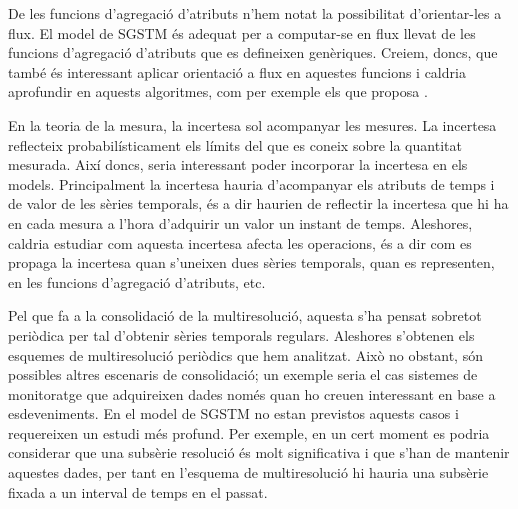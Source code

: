 De les funcions d'agregació d'atributs n'hem notat la possibilitat
d'orientar-les a flux. El model de \gls{SGSTM} és adequat per a
computar-se en flux llevat de les funcions d'agregació d'atributs que
es defineixen genèriques. Creiem, doncs, que també és interessant
aplicar orientació a flux en aquestes funcions i caldria aprofundir en
aquests algoritmes, com per exemple els que proposa
\textcite{cormode08:pods}.



En la teoria de la mesura, la incertesa sol acompanyar les mesures. La
incertesa reflecteix probabilísticament els límits del que es coneix
sobre la quantitat mesurada.  Així doncs, seria interessant poder
incorporar la incertesa en els models.  Principalment la incertesa
hauria d'acompanyar els atributs de temps i de valor de les sèries
temporals, és a dir haurien de reflectir la incertesa que hi ha en
cada mesura a l'hora d'adquirir un valor un instant de
temps. Aleshores, caldria estudiar com aquesta incertesa afecta les
operacions, és a dir com es propaga la incertesa quan s'uneixen dues
sèries temporals, quan es representen, en les funcions d'agregació
d'atributs, etc.




Pel que fa a la consolidació de la multiresolució, aquesta s'ha pensat
sobretot periòdica per tal d'obtenir sèries temporals regulars.
Aleshores s'obtenen els esquemes de multiresolució periòdics que hem
analitzat. Això no obstant, són possibles altres escenaris de
consolidació; un exemple seria el cas sistemes de monitoratge que
adquireixen dades només quan ho creuen interessant en base a
esdeveniments.  En el model de \gls{SGSTM} no estan previstos aquests
casos i requereixen un estudi més profund. Per exemple, en un cert
moment es podria considerar que una subsèrie resolució és molt
significativa i que s'han de mantenir aquestes dades, per tant en
l'esquema de multiresolució hi hauria una subsèrie fixada a un
interval de temps en el passat.





